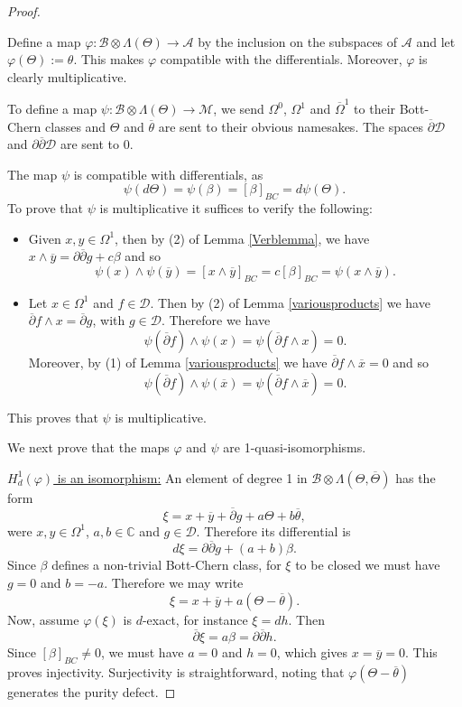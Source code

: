 \documentclass[a4paper]{amsart}
\theoremstyle{definition}
\newcommand{\CC}{\mathbb{C}}
\newcommand{\Aa}{\mathcal{A}}
\newcommand{\Bb}{\mathcal{B}}
\newcommand{\Dd}{\mathcal{D}}
\newcommand{\Mm}{\mathcal{M}}
\newcommand{\ov}{\overline}
\newcommand{\del}{\partial}
\newcommand{\delb}{{\overline\partial}}
\begin{document}
\begin{proof}
\begin{center}
\end{center}



Define a map $\varphi:\Bb\otimes\Lambda(\Theta)\to \Aa$ by the inclusion on the subspaces of $\Aa$ and let
$\varphi(\Theta):=\theta$.
This makes $\varphi$ compatible with the differentials.
Moreover, $\varphi$ is clearly multiplicative.

To define a map $\psi:\Bb\otimes\Lambda(\Theta)\to \Mm$,
we send $\Omega^0$, $\Omega^1$ and $\ov\Omega^1$ to their Bott-Chern classes and
$\Theta$ and $\ov\theta$ are sent to their obvious namesakes. The spaces $\delb \Dd$ and $\del\delb \Dd$ are sent to 0.

The map $\psi$ is compatible with differentials, as
\[\psi(d\Theta)=\psi(\beta)=[\beta]_{BC}=d\psi(\Theta).\]
To prove that $\psi$ is multiplicative it suffices to verify the following:
\begin{itemize}
 \item Given $x,y\in\Omega^1$, then
 by (2) of Lemma \ref{Verblemma}, we have
$x\wedge \ov y=\del \delb g+c\beta$
and so
\[\psi(x)\wedge\psi(\ov y)=[x\wedge \ov y]_{BC}=c[\beta]_{BC}=\psi(x\wedge \ov y).\]
\item Let $x\in \Omega^1$ and $f\in\Dd$. Then by (2) of Lemma \ref{variousproducts} we have $\delb f\wedge x=\delb g$, with $g\in\Dd$.
Therefore we have
\[\psi(\delb f)\wedge\psi(x)=\psi(\delb f\wedge x)=0.\]
Moreover, by (1) of Lemma \ref{variousproducts} we have $\delb f\wedge \ov x=0$ and so
\[\psi(\delb f)\wedge\psi(\ov x)=\psi(\delb f\wedge \ov x)=0.\]
\end{itemize}


This proves that $\psi$ is multiplicative.

We next prove that the maps $\varphi$ and $\psi$ are 1-quasi-isomorphisms.

\underline{$H^1_d(\varphi)$ is an isomorphism:}
An element of degree 1 in $\Bb\otimes\Lambda(\Theta,\ov\Theta)$
has the form
\[\xi=x+\ov y+\delb g+a\Theta+b\ov\theta,\]
were $x,y\in\Omega^1$, $a,b\in\CC$ and $g\in\Dd$.
Therefore its differential is
\[d\xi=\del\delb g+(a+b)\beta.\]
Since $\beta$ defines a non-trivial Bott-Chern class, for $\xi$ to be closed we must have $g=0$  and $b=-a$. Therefore we may write
\[\xi=x+\ov y+a(\Theta-\ov\theta).\]
Now, assume $\varphi(\xi)$ is $d$-exact, for instance $\xi=dh$.
Then
\[\delb \xi=a\beta=\del\delb h.\]
Since $[\beta]_{BC}\neq 0$, we must have $a=0$ and $h=0$, which gives $x=\ov y=0$.
This proves injectivity. Surjectivity is straightforward, noting that $\varphi(\Theta-\ov\theta)$ generates the purity defect.


\end{proof}
\end{document}
